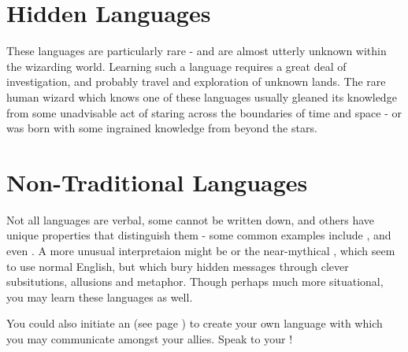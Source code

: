 \section{Hidden Languages}

These languages are particularly rare - and are almost utterly unknown within the wizarding world. Learning such a language requires a great deal of investigation, and probably travel and exploration of unknown lands. The rare human wizard which knows one of these languages usually gleaned its knowledge from some unadvisable act of staring across the boundaries of time and space - or was born with some ingrained knowledge from beyond the stars. 





\section{Non-Traditional Languages}

Not all languages are verbal, some cannot be written down, and others have unique properties that distinguish them - some common examples include ,  and even . A more unusual interpretaion might be  or the near-mythical , which seem to use normal English, but which bury hidden messages through clever subsitutions, allusions and metaphor. Though perhaps much more situational, you may learn these languages as well. 

You could also initiate an  (see page \pageref{S:Extended}) to create your own language with which you may communicate amongst your allies. Speak to your !
